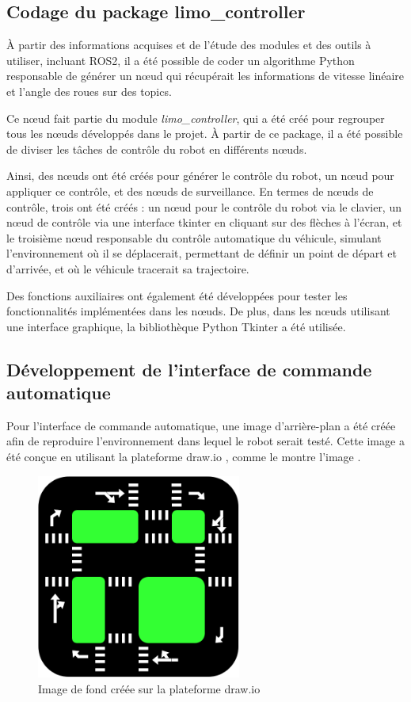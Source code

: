 \subsection{Codage du package limo\_controller}

À partir des informations acquises et de l'étude des modules et des outils à utiliser, incluant ROS2, il a été possible de coder un algorithme Python responsable de générer un nœud qui récupérait les informations de vitesse linéaire et l'angle des roues sur des topics.

Ce nœud fait partie du module \textit{limo\_controller}, qui a été créé pour regrouper tous les nœuds développés dans le projet. À partir de ce package, il a été possible de diviser les tâches de contrôle du robot en différents nœuds.

Ainsi, des nœuds ont été créés pour générer le contrôle du robot, un nœud pour appliquer ce contrôle, et des nœuds de surveillance. En termes de nœuds de contrôle, trois ont été créés : un nœud pour le contrôle du robot via le clavier, un nœud de contrôle via une interface tkinter en cliquant sur des flèches à l'écran, et le troisième nœud responsable du contrôle automatique du véhicule, simulant l'environnement où il se déplacerait, permettant de définir un point de départ et d'arrivée, et où le véhicule tracerait sa trajectoire.

Des fonctions auxiliaires ont également été développées pour tester les fonctionnalités implémentées dans les nœuds. De plus, dans les nœuds utilisant une interface graphique, la bibliothèque Python Tkinter a été utilisée.


\subsection{Développement de l'interface de commande automatique}

Pour l'interface de commande automatique, une image d'arrière-plan a été créée afin de reproduire l'environnement dans lequel le robot serait testé. Cette image a été conçue en utilisant la plateforme draw.io \cite{diagramsnet}, comme le montre l'image \label{imgxx}.

\begin{figure}[!h]
    \centering
    \includegraphics[width=0.6\textwidth]{img/background/background.png} 
    \caption{Image de fond créée sur la plateforme draw.io}
    \label{imgxx}
\end{figure}

